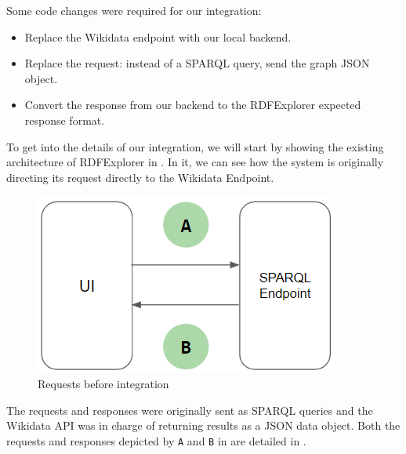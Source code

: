 Some code changes were required for our integration: 
\begin{itemize}
    \item Replace the Wikidata endpoint with our local backend.
    \item Replace the request: instead of a SPARQL query, send the graph JSON object.
    \item Convert the response from our backend to the RDFExplorer expected response format.
\end{itemize} 

To get into the details of our integration, we will start by showing the existing architecture of RDFExplorer in . In it, we can see how the system is originally directing its request directly to the Wikidata Endpoint. 

\begin{figure}[h]
    \centering
        \includegraphics[width=0.4\linewidth]{imagenes/uiBeforeRequest.png}
        \caption{Requests before integration}
        \label{fig:uiBeforeRequests}
\end{figure}

The requests and responses were originally sent as SPARQL queries and the Wikidata API was in charge of returning results as a JSON data object. Both the requests and responses depicted by \texttt{A} and \texttt{B} in  are detailed in .

